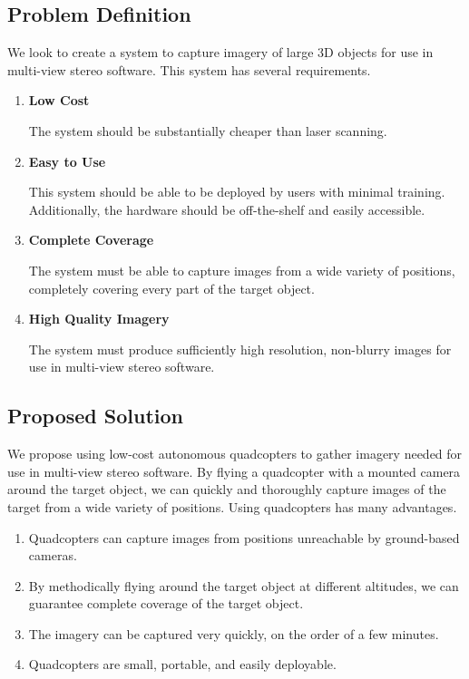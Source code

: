 \subsection{Problem Definition}
We look to create a system to capture imagery of large 3D objects for use in multi-view stereo software. This system has several requirements.

\begin{enumerate}
\item
\textbf{Low Cost}

The system should be substantially cheaper than laser scanning.

\item
\textbf{Easy to Use}

This system should be able to be deployed by users with minimal training. Additionally, the hardware should be off-the-shelf and easily accessible.

\item
\textbf{Complete Coverage}

The system must be able to capture images from a wide variety of positions, completely covering every part of the target object.

\item
\textbf{High Quality Imagery}

The system must produce sufficiently high resolution, non-blurry images for use in multi-view stereo software.

\end{enumerate}

\subsection{Proposed Solution}

We propose using low-cost autonomous quadcopters to gather imagery needed for use in multi-view stereo software. By flying a quadcopter with a mounted camera around the target object, we can quickly and thoroughly capture images of the target from a wide variety of positions. Using quadcopters has many advantages.

\begin{enumerate}
\item
Quadcopters can capture images from positions unreachable by ground-based cameras.

\item
By methodically flying around the target object at different altitudes, we can guarantee complete coverage of the target object.

\item
The imagery can be captured very quickly, on the order of a few minutes.

\item
Quadcopters are small, portable, and easily deployable.


\end{enumerate}

